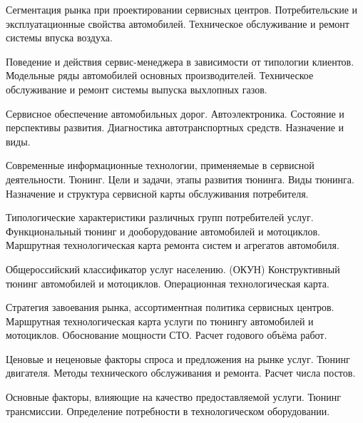 \documentclass[
	11pt,
	a4paper,
	]
	{article}
\begin{document}
\bigskip

\noindent{} 
	{
		Сегментация рынка при проектировании сервисных центров.
	}{
		Потребительские и эксплуатационные свойства автомобилей.
	}{
		Техническое обслуживание и ремонт системы впуска воздуха.
	}

\bigskip

\noindent{} 
	{
		Поведение и действия сервис-менеджера в зависимости от типологии клиентов.
	}{
		Модельные ряды автомобилей основных производителей.
	}{
		Техническое обслуживание и ремонт системы выпуска выхлопных газов.
	}

\bigskip

\noindent{} 
	{
		Сервисное обеспечение автомобильных дорог.
	}{
		Автоэлектроника. Состояние и перспективы развития.
	}{
		Диагностика автотранспортных средств. Назначение и виды.
	}

\bigskip

\noindent{} 
	{
		Современные информационные технологии, применяемые в сервисной деятельности.
	}{
		Тюнинг. Цели и задачи, этапы развития тюнинга. Виды тюнинга.
	}{
		Назначение и структура сервисной карты обслуживания потребителя.
	}

\bigskip

\noindent{} 
	{
		Типологические характеристики различных групп потребителей услуг.
	}{
		Функциональный тюнинг и дооборудование автомобилей и мотоциклов.
	}{
		Маршрутная технологическая карта ремонта систем и агрегатов автомобиля.
	}

\bigskip

\noindent{} 
	{
		Общероссийский классификатор услуг населению. (ОКУН)
	}{
		Конструктивный тюнинг автомобилей и мотоциклов.
	}{
		Операционная технологическая карта.
	}

\bigskip

\noindent{} 
	{
		Стратегия завоевания рынка, ассортиментная политика сервисных центров.
	}{
		Маршрутная технологическая карта услуги по тюнингу автомобилей и мотоциклов.
	}{
		Обоснование мощности СТО. Расчет годового объёма работ.
	}

\bigskip

\noindent{} 
	{
		Ценовые и неценовые факторы спроса и предложения на рынке услуг.
	}{
		Тюнинг двигателя.
	}{
		Методы технического обслуживания и ремонта. Расчет числа постов.
	}

\bigskip

\noindent{} 
	{
		Основные факторы, влияющие на качество предоставляемой услуги.
	}{
		Тюнинг трансмиссии.
	}{
		Определение потребности в технологическом оборудовании.
	}
\end{document}
